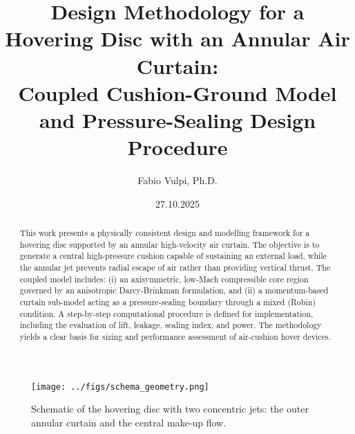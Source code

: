 \documentclass[11pt,a4paper]{article}
\title{Design Methodology for a Hovering Disc with an Annular Air Curtain:\\
Coupled Cushion-Ground Model and Pressure-Sealing Design Procedure}
\author{Fabio Vulpi, Ph.D.}
\date{27.10.2025}
\begin{document}
\maketitle

\begin{abstract}
This work presents a physically consistent design and modelling framework for a hovering disc supported by an annular high-velocity air curtain.
The objective is to generate a central high-pressure cushion capable of sustaining an external load, while the annular jet prevents radial escape of air rather than providing vertical thrust.
The coupled model includes:
(i) an axisymmetric, low-Mach compressible core region governed by an anisotropic Darcy-Brinkman formulation, and
(ii) a momentum-based curtain sub-model acting as a pressure-sealing boundary through a mixed (Robin) condition.
A step-by-step computational procedure is defined for implementation, including the evaluation of lift, leakage, sealing index, and power.
The methodology yields a clear basis for sizing and performance assessment of air-cushion hover devices.
\end{abstract}

\begin{figure}[t]
  \centering
  \texttt{[image: ../figs/schema\_geometry.png]}
  \caption{Schematic of the hovering disc with two concentric jets: the outer annular curtain and the central make-up flow.}
  \label{fig:geometry}
\end{figure}
\end{document}
